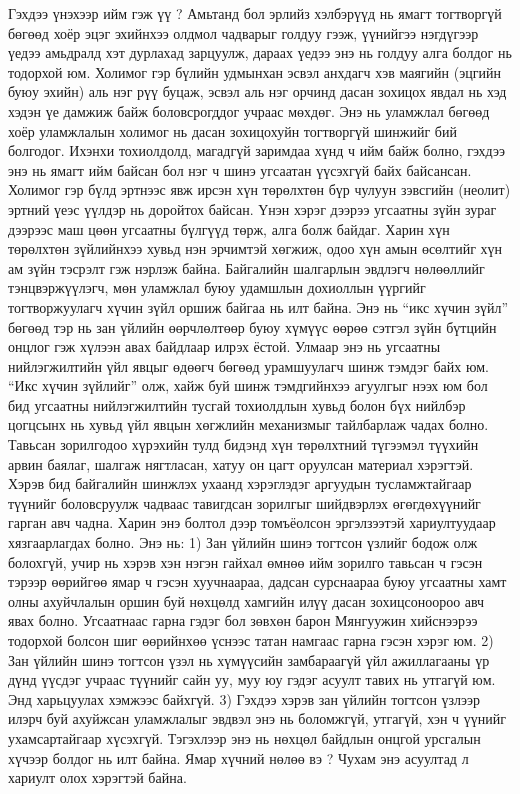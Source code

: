 Гэхдээ үнэхээр ийм гэж үү ? Амьтанд бол эрлийз хэлбэрүүд нь ямагт тогтворгүй бөгөөд хоёр эцэг эхийнхээ олдмол чадварыг голдуу гээж, үүнийгээ нэгдүгээр үедээ амьдралд хэт дурлахад зарцуулж, дараах үедээ энэ нь голдуу алга болдог нь тодорхой юм. Холимог гэр бүлийн удмынхан эсвэл анхдагч хэв маягийн (эцгийн буюу эхийн) аль нэг рүү буцаж, эсвэл аль нэг орчинд дасан зохицох явдал нь хэд хэдэн үе дамжиж байж боловсрогддог учраас мөхдөг. Энэ нь уламжлал бөгөөд хоёр уламжлалын холимог нь дасан зохицохуйн тогтворгүй шинжийг бий болгодог.
Ихэнхи тохиолдолд, магадгүй заримдаа хүнд ч ийм байж болно, гэхдээ энэ нь ямагт ийм байсан бол нэг ч шинэ угсаатан үүсэхгүй байх байсансан. Холимог гэр бүлд эртнээс явж ирсэн хүн төрөлхтөн бүр чулуун зэвсгийн (неолит) эртний үеэс үүлдэр нь доройтох байсан. Үнэн хэрэг дээрээ угсаатны зүйн зураг дээрээс маш цөөн угсаатны бүлгүүд төрж, алга болж байдаг. Харин хүн төрөлхтөн зүйлийнхээ хувьд нэн эрчимтэй хөгжиж, одоо хүн амын өсөлтийг хүн ам зүйн тэсрэлт гэж нэрлэж байна. Байгалийн шалгарлын эвдлэгч нөлөөллийг тэнцвэржүүлэгч, мөн уламжлал буюу удамшлын дохиоллын үүргийг тогтворжуулагч хүчин зүйл оршиж байгаа нь илт байна. Энэ нь “икс хүчин зүйл” бөгөөд тэр нь зан үйлийн өөрчлөлтөөр буюу хүмүүс өөрөө сэтгэл зүйн бүтцийн онцлог гэж хүлээн авах байдлаар илрэх ёстой. Улмаар энэ нь угсаатны нийлэгжилтийн үйл явцыг өдөөгч бөгөөд урамшуулагч шинж тэмдэг байх юм. “Икс хүчин зүйлийг” олж, хайж буй шинж тэмдгийнхээ агуулгыг нээх юм бол бид угсаатны нийлэгжилтийн тусгай тохиолдлын хувьд болон бүх нийлбэр цогцсынх нь хувьд үйл явцын хөгжлийн механизмыг тайлбарлаж чадах болно.
Тавьсан зорилгодоо хүрэхийн тулд бидэнд хүн төрөлхтний түгээмэл түүхийн арвин баялаг, шалгаж нягтласан, хатуу он цагт оруулсан материал хэрэгтэй. Хэрэв бид байгалийн шинжлэх ухаанд хэрэглэдэг аргуудын тусламжтайгаар түүнийг боловсруулж чадваас тавигдсан зорилгыг шийдвэрлэх өгөгдөхүүнийг гарган авч чадна. Харин энэ болтол дээр томъёолсон эргэлзээтэй хариултуудаар хязгаарлагдах болно. Энэ нь: 1) Зан үйлийн шинэ тогтсон үзлийг бодож олж болохгүй, учир нь хэрэв хэн нэгэн гайхал өмнөө ийм зорилго тавьсан ч гэсэн тэрээр өөрийгөө ямар ч гэсэн хуучнаараа, дадсан сурснаараа буюу угсаатны хамт олны ахуйчлалын оршин буй нөхцөлд хамгийн илүү дасан зохицсоноороо авч явах болно. Угсаатнаас гарна гэдэг бол зөвхөн барон Мянгуужин хийснээрээ тодорхой болсон шиг өөрийнхөө үснээс татан намгаас гарна гэсэн хэрэг юм. 2) Зан үйлийн шинэ тогтсон үзэл нь хүмүүсийн замбараагүй үйл ажиллагааны үр дүнд үүсдэг учраас түүнийг сайн уу, муу юу гэдэг асуулт тавих нь утгагүй юм. Энд харьцуулах хэмжээс байхгүй. 3) Гэхдээ хэрэв зан үйлийн тогтсон үзлээр илэрч буй ахуйжсан уламжлалыг эвдвэл энэ нь боломжгүй, утгагүй, хэн ч үүнийг ухамсартайгаар хүсэхгүй. Тэгэхлээр энэ нь нөхцөл байдлын онцгой урсгалын хүчээр болдог нь илт байна. Ямар хүчний нөлөө вэ ? Чухам энэ асуултад л хариулт олох хэрэгтэй байна.


